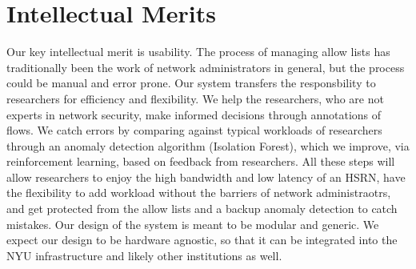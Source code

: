 \section{Intellectual Merits}

Our key intellectual merit is usability. The process of managing allow lists has traditionally been the work of network administrators in general, but the process could be manual and error prone. Our system transfers the responsbility to researchers for efficiency and flexibility. We help the researchers, who are not experts in network security, make informed decisions through annotations of flows. We catch errors by comparing against typical workloads of researchers through an anomaly detection algorithm (Isolation Forest), which we improve, via reinforcement learning, based on feedback from researchers. All these steps will allow researchers to enjoy the high bandwidth and low latency of an HSRN, have the flexibility to add workload without the barriers of network administraotrs, and get protected from the allow lists and a backup anomaly detection to catch mistakes. Our design of the system is meant to be modular and generic. We expect our design to be hardware agnostic, so that it can be integrated into the NYU infrastructure and likely other institutions as well.
